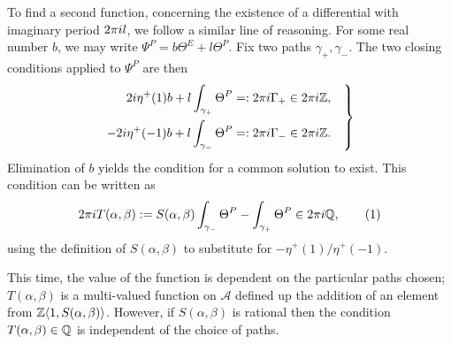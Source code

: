 \documentclass{article}
\begin{document}
To find a second function, concerning the existence of a differential with imaginary period $2\pi i l$, we follow a similar line of reasoning. For some real number $b$, we may write $\Psi^P = b \Theta^E + l \Theta^P$. Fix two paths $\gamma_+, \gamma_-$. The two closing conditions applied to $\Psi^P$ are then
\begin{equation}
\left.
\begin{aligned}
2i \eta^+(1) b + l\int_{\gamma_+} \Theta^P &=: 2\pi i \Gamma_+ \in 2\pi i \mathbb{Z}, \\
-2i \eta^+(-1) b + l\int_{\gamma_-} \Theta^P &=: 2\pi i \Gamma_- \in 2\pi i \mathbb{Z}.
\end{aligned}
\quad
\right\}
\label{eqn:period closing cond}
\end{equation}
Elimination of $b$ yields the condition for a common solution to exist. This condition can be written as
\[
2\pi\iu T(\alpha,\beta) := S(\alpha,\beta) \int_{\gamma_-} \Theta^P - \int_{\gamma_+} \Theta^P
\in 2\pi\iu \Q,
\labelthis{eqn:def_T}
\]
using the definition of $S(\alpha,\beta)$ to substitute for $-\eta^+(1)/\eta^+(-1)$. 

This time, the value of the function is dependent on the particular paths chosen; 
$T(\alpha,\beta)$ is a multi-valued function on $\mathcal{A}$ defined up the addition of an element from $\mathbb{Z}\langle 1,S(\alpha,\beta)\rangle$.
However, if $S(\alpha,\beta)$ is rational then the condition $T(\alpha,\beta)\in\mathbb{Q}$ is independent of the choice of paths.
\end{document}

